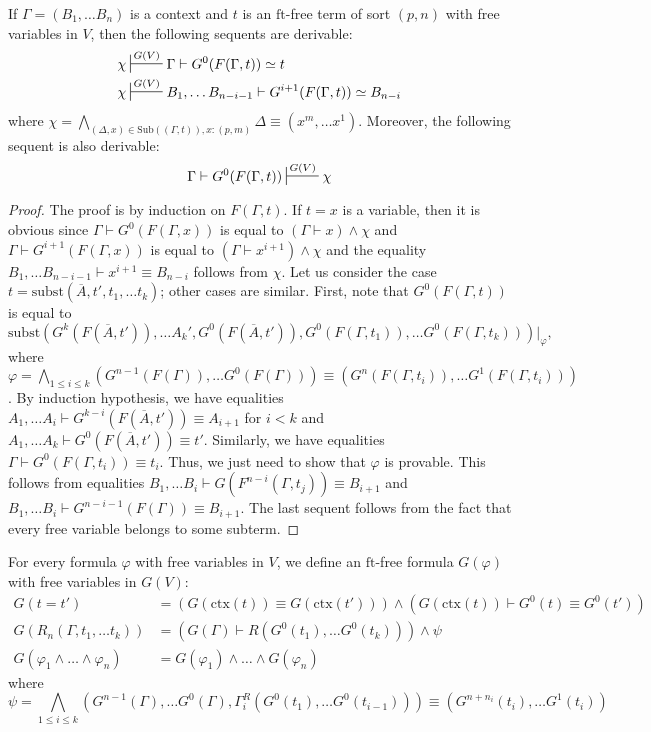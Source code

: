 \documentclass[reqno]{amsart}
\theoremstyle{definition}
\theoremstyle{remark}
\newcommand{\fs}[1]{\mathrm{#1}}
\newcommand{\subst}{\fs{subst}}
\newcommand{\ft}{\fs{ft}}
\newcommand{\ctx}{\fs{ctx}}
\newcommand{\sub}{\fs{Sub}}
\numberwithin{figure}{section}
\begin{document}
\begin{lem}
If $\Gamma = (B_1, \ldots B_n)$ is a context and $t$ is an $\ft$-free term of sort $(p,n)$ with free variables in $V$, then the following sequents are derivable:
\begin{align*}
\chi & \sststile{}{G(V)} \Gamma \vdash G^0(F(\Gamma,t)) \simeq t \\
\chi & \sststile{}{G(V)} B_1, \ldots B_{n-i-1} \vdash G^{i+1}(F(\Gamma,t)) \simeq B_{n-i}
\end{align*}
where $\chi = \bigwedge_{(\Delta,x) \in \sub((\Gamma,t)), x : (p,m)} \Delta \equiv (x^m, \ldots x^1)$.
Moreover, the following sequent is also derivable:
\[ \Gamma \vdash G^0(F(\Gamma,t)) \sststile{}{G(V)} \chi \]
\end{lem}
\begin{proof}
The proof is by induction on $F(\Gamma,t)$.
If $t = x$ is a variable, then it is obvious since $\Gamma \vdash G^0(F(\Gamma,x))$ is equal to $(\Gamma \vdash x) \land \chi$ and $\Gamma \vdash G^{i+1}(F(\Gamma,x))$ is equal to $(\Gamma \vdash x^{i+1}) \land \chi$ and the equality $B_1, \ldots B_{n-i-1} \vdash x^{i+1} \equiv B_{n-i}$ follows from $\chi$.
Let us consider the case $t = \subst(\overline{A}, t', t_1, \ldots t_k)$; other cases are similar.
First, note that $G^0(F(\Gamma,t))$ is equal to
\[ \subst(G^k(F(\overline{A},t')), \ldots A_k', G^0(F(\overline{A},t')), G^0(F(\Gamma,t_1)), \ldots G^0(F(\Gamma,t_k)))|_\varphi, \]
where $\varphi = \bigwedge_{1 \leq i \leq k} (G^{n-1}(F(\Gamma)), \ldots G^0(F(\Gamma))) \equiv (G^n(F(\Gamma,t_i)), \ldots G^1(F(\Gamma,t_i)))$.
By induction hypothesis, we have equalities $A_1, \ldots A_i \vdash G^{k-i}(F(\overline{A},t')) \equiv A_{i+1}$ for $i < k$ and $A_1, \ldots A_k \vdash G^0(F(\overline{A},t')) \equiv t'$.
Similarly, we have equalities $\Gamma \vdash G^0(F(\Gamma,t_i)) \equiv t_i$.
Thus, we just need to show that $\varphi$ is provable.
This follows from equalities $B_1, \ldots B_i \vdash G(F^{n-i}(\Gamma,t_j)) \equiv B_{i+1}$ and $B_1, \ldots B_i \vdash G^{n-i-1}(F(\Gamma)) \equiv B_{i+1}$.
The last sequent follows from the fact that every free variable belongs to some subterm.
\end{proof}

For every formula $\varphi$ with free variables in $V$, we define an $\ft$-free formula $G(\varphi)$ with free variables in $G(V)$:
\begin{align*}
G(t = t') & = (G(\ctx(t)) \equiv G(\ctx(t'))) \land (G(\ctx(t)) \vdash G^0(t) \equiv G^0(t')) \\
G(R_n(\Gamma, t_1, \ldots t_k)) & = (G(\Gamma) \vdash R(G^0(t_1), \ldots G^0(t_k))) \land \psi \\
G(\varphi_1 \land \ldots \land \varphi_n) & = G(\varphi_1) \land \ldots \land G(\varphi_n)
\end{align*}
 where
 \[ \psi = \bigwedge_{1 \leq i \leq k} (G^{n-1}(\Gamma), \ldots G^0(\Gamma), \Gamma^R_i(G^0(t_1), \ldots G^0(t_{i-1}))) \equiv (G^{n+n_i}(t_i), \ldots G^1(t_i)) \]
\end{document}

